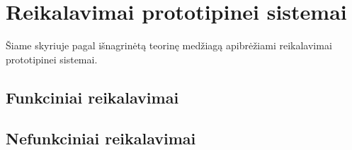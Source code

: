 \section{Reikalavimai prototipinei sistemai}
Šiame skyriuje pagal išnagrinėtą teorinę medžiagą apibrėžiami reikalavimai prototipinei sistemai.
\subsection{Funkciniai reikalavimai}

\subsection{Nefunkciniai reikalavimai}
